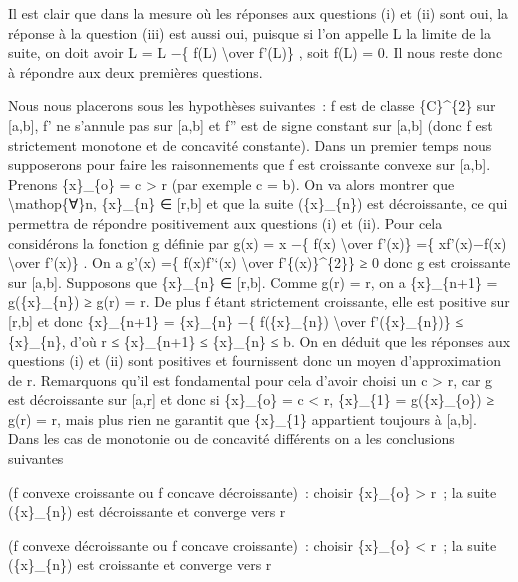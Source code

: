 \documentclass[]{article}
\begin{document}
Il est clair que dans la mesure où les réponses aux questions (i) et
(ii) sont oui, la réponse à la question (iii) est aussi oui, puisque si
l'on appelle L la limite de la suite, on doit avoir L = L −\{ f(L)
\textbackslash{}over f'(L)\} , soit f(L) = 0. Il nous reste donc à
répondre aux deux premières questions.

Nous nous placerons sous les hypothèses suivantes~: f est de classe
\{C\}\^{}\{2\} sur {[}a,b{]}, f' ne s'annule pas sur {[}a,b{]} et f''
est de signe constant sur {[}a,b{]} (donc f est strictement monotone et
de concavité constante). Dans un premier temps nous supposerons pour
faire les raisonnements que f est croissante convexe sur {[}a,b{]}.
Prenons \{x\}\_\{o\} = c \textgreater{} r (par exemple c = b). On va
alors montrer que \textbackslash{}mathop\{∀\}n, \{x\}\_\{n\} ∈ {[}r,b{]}
et que la suite (\{x\}\_\{n\}) est décroissante, ce qui permettra de
répondre positivement aux questions (i) et (ii). Pour cela considérons
la fonction g définie par g(x) = x −\{ f(x) \textbackslash{}over f'(x)\}
=\{ xf'(x)−f(x) \textbackslash{}over f'(x)\} . On a g'(x) =\{ f(x)f'`(x)
\textbackslash{}over f'\{(x)\}\^{}\{2\}\} ≥ 0 donc g est croissante sur
{[}a,b{]}. Supposons que \{x\}\_\{n\} ∈ {[}r,b{]}. Comme g(r) = r, on a
\{x\}\_\{n+1\} = g(\{x\}\_\{n\}) ≥ g(r) = r. De plus f étant strictement
croissante, elle est positive sur {[}r,b{]} et donc \{x\}\_\{n+1\} =
\{x\}\_\{n\} −\{ f(\{x\}\_\{n\}) \textbackslash{}over f'(\{x\}\_\{n\})\}
≤ \{x\}\_\{n\}, d'où r ≤ \{x\}\_\{n+1\} ≤ \{x\}\_\{n\} ≤ b. On en déduit
que les réponses aux questions (i) et (ii) sont positives et fournissent
donc un moyen d'approximation de r. Remarquons qu'il est fondamental
pour cela d'avoir choisi un c \textgreater{} r, car g est décroissante
sur {[}a,r{]} et donc si \{x\}\_\{o\} = c \textless{} r, \{x\}\_\{1\} =
g(\{x\}\_\{o\}) ≥ g(r) = r, mais plus rien ne garantit que \{x\}\_\{1\}
appartient toujours à {[}a,b{]}. Dans les cas de monotonie ou de
concavité différents on a les conclusions suivantes

(f convexe croissante ou f concave décroissante)~: choisir \{x\}\_\{o\}
\textgreater{} r~; la suite (\{x\}\_\{n\}) est décroissante et converge
vers r

(f convexe décroissante ou f concave croissante)~: choisir \{x\}\_\{o\}
\textless{} r~; la suite (\{x\}\_\{n\}) est croissante et converge vers
r
\end{document}
